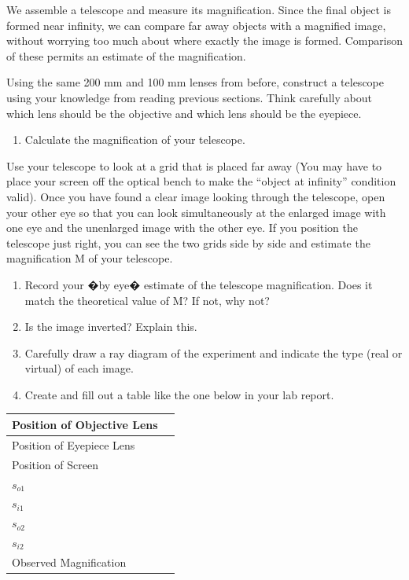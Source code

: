 We assemble a telescope and measure its magnification. Since the final object is formed near infinity, we can compare far away objects with a magnified image, without worrying too much about where exactly the image is formed. Comparison of these permits an estimate of the magnification.\myskip

Using the same 200 mm and 100 mm lenses from before, construct a telescope using your knowledge from reading previous sections. Think carefully about which lens should be the objective and which lens should be the eyepiece.
\begin{enumerate}
\item Calculate the magnification of your telescope.
\end{enumerate}

Use your telescope to look at a grid that is placed far away (You may have to place your screen off the optical bench to make the ``object at infinity'' condition valid). Once you have found a clear image looking through the telescope, open your other eye so that you can look simultaneously at the enlarged image with one eye and the unenlarged image with the other eye. If you position the telescope just right, you can see the two grids side by side and estimate the magnification M of your telescope.
\begin{enumerate}
\item Record your �by eye� estimate of the telescope magnification. Does it match the theoretical value of M? If not, why not?

\item Is the image inverted? Explain this.

\item Carefully draw a ray diagram of the experiment and indicate the type (real or virtual) of each image.

\item Create and fill out a table like the one below in your lab report.

\end{enumerate}

\begin{center}
\begin{tabular}{|l|l|}
\hline
Position of Objective Lens & \hspace{4 cm} \\ \hline
Position of Eyepiece Lens &                    \\ \hline
Position of Screen &                    \\ \hline
$s_{o1}$ & \\ \hline
$s_{i1}$ & \\ \hline
$s_{o2}$ & \\ \hline
$s_{i2}$ & \\ \hline
Observed Magnification & \\ \hline
\end{tabular}
\end{center}

